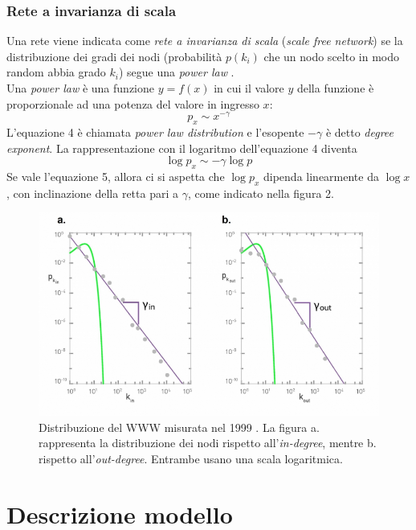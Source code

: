 \documentclass[a4paper,12pt]{article}
\begin{document}
\subsubsection{Rete a invarianza di scala}
Una rete viene indicata come \textit{rete a invarianza di scala} (\textit{scale free network}) se la distribuzione dei gradi dei nodi (probabilità $p(k_i)$ che un nodo scelto in modo random abbia grado $k_i$) segue una \textit{power law} \cite{scalefree}.\\
Una \textit{power law} \cite{barabasi} è una funzione $y=f(x)$ in cui il valore $y$ della funzione è proporzionale ad una potenza del valore in ingresso $x$:
\begin{equation}
p_x \sim x^{-\gamma}
\end{equation}
L'equazione 4 è chiamata \textit{power law distribution} e l'esopente $-\gamma$ è detto \textit{degree exponent}. La rappresentazione con il logaritmo dell'equazione 4 diventa
\begin{equation}
\log p_x \sim -\gamma \log p
\end{equation}
Se vale l'equazione 5, allora ci si aspetta che $\log p_x$ dipenda linearmente da $\log x$, con inclinazione della retta pari a $\gamma$, come indicato nella figura 2. 
\begin{figure}[h]
\centering
\includegraphics[scale=0.59]{images/powerlaw.png}
\caption{Distribuzione del WWW misurata nel 1999 \cite{barabasi}. La figura a. rappresenta la distribuzione dei nodi rispetto all'\textit{in-degree}, mentre b. rispetto all'\textit{out-degree}. Entrambe usano una scala logaritmica.}
\end{figure}
\section{Descrizione modello} 
\label{sec:mod}
\end{document}

